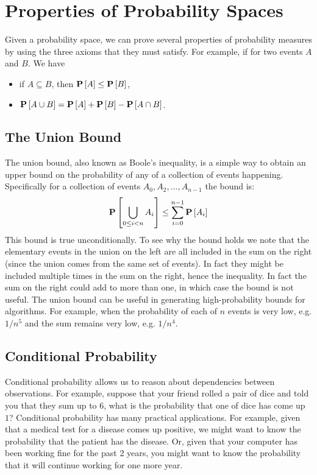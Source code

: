 \section{Properties of Probability Spaces}
\label{sec:probability::theory::spaces-properties}


Given a probability space, we can prove several properties of
probability measures by using the three axioms that they must satisfy.
%
For example, if for two events $A$ and $B$.  We have
\begin{itemize}
\item if $A \subseteq B$, then  $\mathbf{P}\left[{A}\right] \le \mathbf{P}\left[{B}\right]$,
\item $\mathbf{P}\left[{A \cup B}\right] = \mathbf{P}\left[{A}\right]  + \mathbf{P}\left[{B}\right] -  \mathbf{P}\left[{A \cap B}\right]$.
\end{itemize}


\subsection{The Union Bound}
\label{sec:probability::theory::union-bound}

The union bound, also known as Boole's inequality, is a simple way to
obtain an upper bound on the probability of any of a collection of events
happening.  Specifically for a collection of events
$A_0, A_2, \ldots, A_{n-1}$ the bound is:
\[
\mathbf{P}\left[{\bigcup_{0 \leq i < n} A_i}\right] \leq \sum_{i=0}^{n-1} \mathbf{P}\left[{A_i}\right] 
\]
This bound is true unconditionally.
%
To see why the bound holds we note that the elementary events
in the union on the left are all included in the sum on the right
(since the union comes from the same set of events).  
%
In fact they
might be included multiple times in the sum on the right, hence the
inequality.  In fact the sum on the right could add to more than one, in
which case the bound is not useful.  
%
The union bound can be useful in generating high-probability bounds
for algorithms. For example, when the probability of each of $n$
events is very low, e.g. $1/n^5$ and the sum remains very low,
e.g. $1/n^4$.


\subsection{Conditional Probability}
\label{sec:probability::theory::conditional-pr}


Conditional probability allows us to reason about dependencies between
observations.  
%
For example, suppose that  your friend rolled a pair of dice and told
you that they sum up to $6$, what is the probability that one of
dice has come up $1$?  
%
Conditional probability has many practical applications.
%
For example, given that a medical test for a disease comes up
positive, we might want to know  the probability that the patient has the disease. 
%
Or, given that your computer has been working fine for the past 2
years, you might want to know the probability that it will continue
working for one more year.


